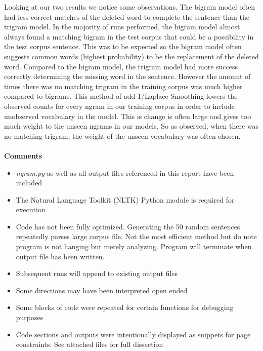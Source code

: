 \documentclass{article}
\begin{document}
Looking at our two results we notice some observations. The bigram model often had less correct matches of the deleted word to complete the sentence than the trigram model. In the majority of runs performed, the bigram model almost always found a matching bigram in the test corpus that could be a possibility in the test corpus sentence. This was to be expected so the bigram model often suggests common words (highest probability) to be the replacement of the deleted word. Compared to the bigram model, the trigram model had more success correctly determining the missing word in the sentence. However the amount of times there was no matching trigram in the training corpus was much higher compared to bigrams. This method of add-1/Laplace Smoothing lowers the observed counts for every ngram in our training corpus in order to include unobserved vocabulary in the model. This is change is often large and gives too much weight to the unseen ngrams in our models. So as observed, when there was no matching trigram, the weight of the unseen vocabulary was often chosen.  
\\
\\
\textbf{Comments}
\begin{itemize}
\item \textit{ngram.py} as well as all output files referenced in this report have been included
\item The Natural Language Toolkit (NLTK) Python module is required for execution
\item Code has not been fully optimized. Generating the 50 random sentences repeatedly parses large corpus file. Not the most efficient method but do note program is not hanging but merely analyzing. Program will terminate when output file has been written.
\item Subsequent runs will append to existing output files
\item Some directions may have been interpreted open ended
\item Some blocks of code were repeated for certain functions for debugging purposes
\item Code sections and outputs were intentionally displayed as snippets for page constraints. See attached files for full dissection
\end{itemize}
\end{document}
